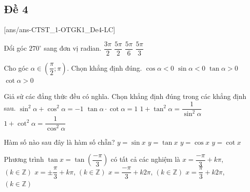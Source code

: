 \subsection{Đề 4}
[ans/ans-CTST_1-OTGK1_De4-LC]
\caulc
\begin{ex}%
	Đổi góc $270^\circ$ sang đơn vị radian.
	\choice
	{\True $\dfrac{3\pi}{2} $}
	{$\dfrac{5\pi}{2} $}
	{$\dfrac{5\pi}{6} $}
	{$\dfrac{5\pi}{3} $}
\end{ex}
\begin{ex}%
	Cho góc $\alpha \in \left(\dfrac{\pi}{2};\pi\right)$. Chọn khẳng định đúng.
	\choice
	{\True $\cos \alpha <0 $}
	{$\sin \alpha <0 $}
	{$\tan \alpha >0 $}
	{$\cot \alpha >0 $} 
\end{ex}
\begin{ex}%
	Giả sử các đẳng thức đều có nghĩa. Chọn khẳng định đúng trong các khẳng định sau.
	\choice
	{$\sin^2 \alpha+\cos^2\alpha=-1$}
	{\True $\tan \alpha \cdot \cot \alpha=1$}
	{$1+\tan^2 \alpha=\dfrac{1}{\sin^2\alpha}$}
	{$1+\cot^2 \alpha=\dfrac{1}{\cos^2\alpha}$}
\end{ex}
\begin{ex}%
	Hàm số nào sau đây là hàm số chẵn?
	\choice
	{$y=\sin x$}
	{$y=\tan x$}
	{\True $y=\cos x$}
	{$y=\cot x$}
\end{ex}
\begin{ex}%
	Phương trình $ \tan x=\tan\left(\dfrac{-\pi}{3}\right)$ có tất cả các nghiệm là
	\choice
	{\True $x=\dfrac{-\pi}{3}+k\pi$, $(k\in\mathbb{Z})$}
	{$x=\pm \dfrac{\pi}{3}+k\pi$, $(k\in\mathbb{Z})$}
	{$x=\dfrac{-\pi}{3}+k2\pi$, $(k\in\mathbb{Z})$}
	{$x=\dfrac{\pi}{3}+k2\pi$, $(k\in\mathbb{Z})$}
\end{ex}
